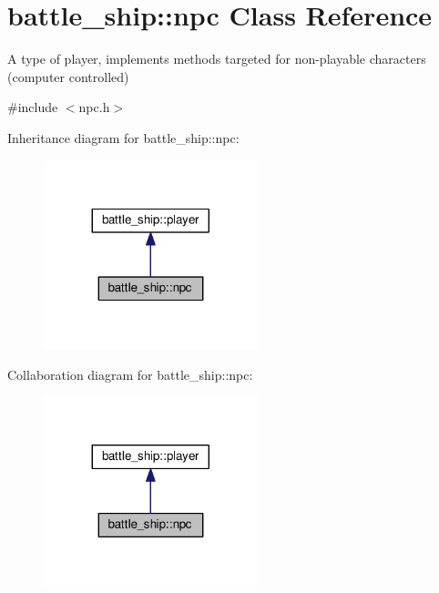 \hypertarget{classbattle__ship_1_1npc}{}\section{battle\+\_\+ship\+:\+:npc Class Reference}
\label{classbattle__ship_1_1npc}


A type of player, implements methods targeted for non-\/playable characters (computer controlled)  




{\ttfamily \#include $<$npc.\+h$>$}



Inheritance diagram for battle\+\_\+ship\+:\+:npc\+:
\nopagebreak
\begin{figure}[H]
\begin{center}
\leavevmode
\includegraphics[width=176pt]{classbattle__ship_1_1npc__inherit__graph}
\end{center}
\end{figure}


Collaboration diagram for battle\+\_\+ship\+:\+:npc\+:
\nopagebreak
\begin{figure}[H]
\begin{center}
\leavevmode
\includegraphics[width=176pt]{classbattle__ship_1_1npc__coll__graph}
\end{center}
\end{figure}
